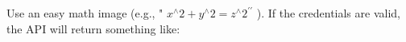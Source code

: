 Use an easy math image (e.g., " \( x^{\wedge} 2+y^{\wedge} 2=z^{\wedge} 2^{\prime \prime} \) ).
If the credentials are valid, the API will return something like: